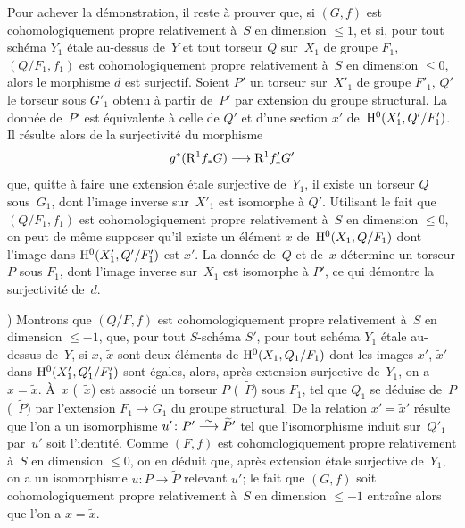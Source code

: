 Pour achever la d\'emonstration, il reste \`a prouver que, si
$(G,f)$ est cohomologiquement propre relativement \`a~$S$ en
dimension $\leqslant 1$, et si, pour tout sch\'ema $Y_1$ \'etale
au-dessus de~$Y$ et tout torseur $Q$ sur~$X_1$ de groupe $F_1$,
$(Q/F_1, f_1)$ est cohomologiquement propre relativement \`a~$S$ en
dimension $\leqslant 0$, alors le morphisme $d$ est surjectif. Soient
$P'$ un torseur sur~$X'_1$ de groupe $F'_1$, $Q'$ le torseur sous
$G'_1$ obtenu \`a partir de~$P'$ par extension du groupe
structural. La donn\'ee de~$P'$ est \'equivalente \`a celle de
$Q'$ et d'une section $x'$ de~$\mathrm{H}^0(X'_1,Q'/F'_1)$. Il r\'esulte
alors de la surjectivit\'e du morphisme
$$
g^*(\R^1 f_* G) \to \R^1 f'_* G'
$$
que, quitte \`a faire une extension \'etale surjective de~$Y_1$,
il existe un torseur $Q$ sous~$G_1$, dont l'image inverse sur~$X'_1$
est isomorphe \`a $Q'$. Utilisant le fait que $(Q/F_1, f_1)$ est
cohomologiquement propre relativement \`a~$S$ en dimension
$\leqslant 0$, on peut de m\^eme supposer qu'il existe un
\'el\'ement $x$ de~$\mathrm{H}^0(X_1, Q/F_1)$ dont l'image dans
$\mathrm{H}^0(X'_1, Q'/F'_1)$ est $x'$. La donn\'ee de~$Q$ et de~$x$
d\'etermine un torseur $P$ sous $F_1$, dont l'image inverse sur~$X_1$ est isomorphe \`a $P'$, ce qui d\'emontre la
surjectivit\'e de~$d$.

) Montrons que $(Q/F,f)$ est cohomologiquement propre
relativement \`a~$S$ en dimension $\leqslant -1$, \ie que, pour
tout $S$-sch\'ema $S'$, pour tout sch\'ema $Y_1$ \'etale
au-dessus de~$Y$, si $x$, $\tilde{x}$ sont deux \'el\'ements de
$\mathrm{H}^0(X_1,Q_1/F_1)$ dont les images $x'$, $\tilde{x}'$ dans
$\mathrm{H}^0(X'_1, Q'_1/F'_1)$ sont \'egales, alors, apr\`es extension
surjective de~$Y_1$, on a $x = \tilde{x}$. \`A~$x$ (\resp~$\tilde{x}$)
est associ\'e un torseur $P$ (\resp~$\tilde{P}$) sous $F_1$, tel que
$Q_1$ se d\'eduise de~$P$ (\resp~$\tilde{P}$) par l'extension $F_1
\to G_1$ du groupe structural. De la relation $x' = \tilde{x}'$
r\'esulte que l'on a un isomorphisme $u' \colon P' \overset{\sim}{\longrightarrow}
\widetilde{P}'$ tel que l'isomorphisme induit sur~$Q'_1$ par~$u'$ soit
l'identit\'e. Comme $(F,f)$ est cohomologiquement propre
relativement \`a~$S$ en dimension $\leqslant 0$, on en d\'eduit
que,
apr\`es extension \'etale surjective de~$Y_1$, on a un
isomorphisme $u \colon P \to \tilde{P}$ relevant $u'$; le fait que
$(G,f)$ soit cohomologiquement propre relativement \`a~$S$ en
dimension $\leqslant -1$ entra\^ine alors que l'on a $x =
\tilde{x}$.


